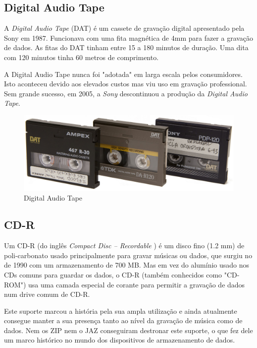 \documentclass{report}
\begin{document}
		\subsection{Digital Audio Tape}
	A \textit{Digital Audio Tape} (DAT) é um cassete de gravação digital apresentado pela Sony em 1987.	
	Funcionava com uma fita magnética de 4mm para fazer a gravação de dados. As fitas do DAT tinham entre 15 a 180 minutos de duração. Uma dita com 120 minutos tinha 60 metros de comprimento.
	
	A Digital Audio Tape nunca foi "adotada" em larga escala pelos consumidores. Isto aconteceu devido aos elevados custos mas viu uso em gravação professional.
	Sem grande sucesso, em 2005, a \textit{Sony} descontinuou a produção da \textit{Digital Audio Tape}.
	 
	
	\begin{figure} [h]
		\centering
		\includegraphics[scale=0.3]{dat.jpg}
		\caption{Digital Audio Tape}
	\end{figure}

\newpage
	

		\subsection{CD-R}
	
	Um CD-R (do inglês \textit{Compact Disc – Recordable} ) é um disco fino (1.2 mm) de poli-carbonato usado principalmente para gravar músicas ou dados, que surgiu no de 1990 com um armazenamento de 700 MB. Mas em vez do alumínio usado nos CDs comuns para guardar os dados, o CD-R (também conhecidos como "CD-ROM") usa uma camada especial de corante para permitir a gravação de dados num drive comum de CD-R.
\vspace{1mm}

	Este suporte marcou a história pela sua ampla utilização e ainda atualmente consegue manter a sua presença tanto ao nível da gravação de música como de dados. Nem os ZIP nem o JAZ conseguiram destronar este suporte, o que fez dele um marco histórico no mundo dos dispositivos de armazenamento de dados.
\vspace{1mm}
\end{document}
